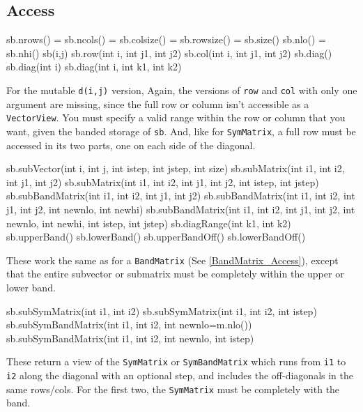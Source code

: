 \documentclass[twoside,letterpaper,11pt]{article}
\renewcommand{\tt}[1]{{\lstinline {#1}}}
\begin{document}
\subsection{Access}
\label{SymBandMatrix_Access}

\begin{tmvcode}
sb.nrows() = sb.ncols() = sb.colsize() = sb.rowsize() = sb.size()
sb.nlo() = sb.nhi()
sb(i,j)
sb.row(int i, int j1, int j2)
sb.col(int i, int j1, int j2)
sb.diag()
sb.diag(int i)
sb.diag(int i, int k1, int k2)
\end{tmvcode}
For the mutable \tt{d(i,j)} version, 
Again, the versions of \tt{row} and \tt{col} with only one argument are
missing, since the full row or column isn't accessible as a \tt{VectorView}.
You must specify a valid range within the row or column that you want, 
given the banded storage of \tt{sb}.  And, like for \tt{SymMatrix}, a full row
must be accessed in its two parts, one on each side of the diagonal.

\begin{tmvcode}
sb.subVector(int i, int j, int istep, int jstep, int size)
sb.subMatrix(int i1, int i2, int j1, int j2)
sb.subMatrix(int i1, int i2, int j1, int j2, int istep, int jstep)
sb.subBandMatrix(int i1, int i2, int j1, int j2)
sb.subBandMatrix(int i1, int i2, int j1, int j2, int newnlo, int newhi)
sb.subBandMatrix(int i1, int i2, int j1, int j2, int newnlo, int newhi, 
      int istep, int jstep)
sb.diagRange(int k1, int k2)
sb.upperBand()
sb.lowerBand()
sb.upperBandOff()
sb.lowerBandOff()
\end{tmvcode}
These work the same as for a \tt{BandMatrix}
(See \ref{BandMatrix_Access}),
except that the entire
subvector or submatrix must be completely within the upper or lower band.


\begin{tmvcode}
sb.subSymMatrix(int i1, int i2)
sb.subSymMatrix(int i1, int i2, int istep)
sb.subSymBandMatrix(int i1, int i2, int newnlo=m.nlo())
sb.subSymBandMatrix(int i1, int i2, int newnlo, int istep)
\end{tmvcode}
These return a view of the \tt{SymMatrix} or \tt{SymBandMatrix} which runs
from \tt{i1} to \tt{i2} along the diagonal with an optional step,
and includes the off-diagonals in the same rows/cols.  For the first two,
the \tt{SymMatrix} must be completely with the band.
\end{document}
